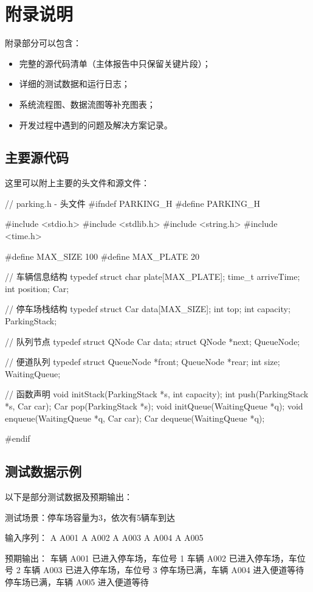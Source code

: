 \documentclass[a4paper,12pt,twoside]{ctexrep}
\begin{document}
\cleardoublepage
\chapter{附录说明}

附录部分可以包含：

\begin{itemize}
  \item 完整的源代码清单（主体报告中只保留关键片段）；
  \item 详细的测试数据和运行日志；
  \item 系统流程图、数据流图等补充图表；
  \item 开发过程中遇到的问题及解决方案记录。
\end{itemize}

\section{主要源代码}

这里可以附上主要的头文件和源文件：

\begin{codeblock}
// parking.h - 头文件
#ifndef PARKING_H
#define PARKING_H

#include <stdio.h>
#include <stdlib.h>
#include <string.h>
#include <time.h>

#define MAX_SIZE 100
#define MAX_PLATE 20

// 车辆信息结构
typedef struct {
    char plate[MAX_PLATE];
    time_t arriveTime;
    int position;
} Car;

// 停车场栈结构
typedef struct {
    Car data[MAX_SIZE];
    int top;
    int capacity;
} ParkingStack;

// 队列节点
typedef struct QNode {
    Car data;
    struct QNode *next;
} QueueNode;

// 便道队列
typedef struct {
    QueueNode *front;
    QueueNode *rear;
    int size;
} WaitingQueue;

// 函数声明
void initStack(ParkingStack *s, int capacity);
int push(ParkingStack *s, Car car);
Car pop(ParkingStack *s);
void initQueue(WaitingQueue *q);
void enqueue(WaitingQueue *q, Car car);
Car dequeue(WaitingQueue *q);

#endif
\end{codeblock}

\section{测试数据示例}

以下是部分测试数据及预期输出：

\begin{codeblock}
测试场景：停车场容量为3，依次有5辆车到达

输入序列：
A A001
A A002
A A003
A A004
A A005

预期输出：
车辆 A001 已进入停车场，车位号 1
车辆 A002 已进入停车场，车位号 2
车辆 A003 已进入停车场，车位号 3
停车场已满，车辆 A004 进入便道等待
停车场已满，车辆 A005 进入便道等待
\end{codeblock}
\end{document}
